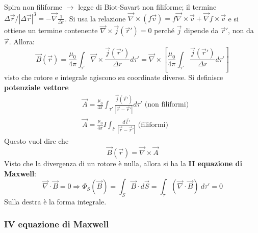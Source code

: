 \documentclass[a4paper]{scrartcl}
\numberwithin{equation}{subsection}
\theoremstyle{style1}
\begin{document}
Spira non filiforme $\to$ legge di Biot-Savart non filiforme; il termine $\Delta \vec{r} / \left\lvert \Delta \vec{r} \right\rvert ^3 = -\vec{\nabla } \frac{1}{\Delta r}$. Si usa la relazione $\vec{\nabla }\times (f \vec{v}) = f\vec{\nabla }\times \vec{v} + \vec{\nabla }f \times \vec{v}$ e si ottiene un termine contenente $\vec{\nabla }\times \vec{j}(\vec{r}') =0$ perch\'e $\vec{j}$ dipende da $\vec{r}' $, non da $\vec{r}$. Allora:
\begin{equation}
	\vec{B}(\vec{r}) = \frac{\mu_0}{4 \pi }\int_{\tau '} \vec{\nabla }\times \frac{\vec{j}(\vec{r}')}{\Delta r}d\tau ' = \vec{\nabla }\times \left[ \frac{\mu_0}{4\pi}\int_{\tau '} \frac{\vec{j}(\vec{r}')}{\Delta r }d\tau ' \right] 
\end{equation}
visto che rotore e integrale agiscono su coordinate diverse. Si definisce \textbf{potenziale vettore} 
\begin{equation}
	\begin{split}
		&\vec{A} = \frac{\mu_0}{4 \pi }\int_{\tau '} \frac{\vec{j}(\vec{r}') }{\left\lvert \vec{r}-\vec{r}' \right\rvert }d\tau ' \text{ (non filiformi}) \\
		&\vec{A} = \frac{\mu_0}{4 \pi }I\int_{l '} \frac{d\vec{l}' }{\left\lvert \vec{r}-\vec{r}' \right\rvert }  \text{ (filiformi}) 
	\end{split}
\end{equation}
Questo vuol dire che
\begin{equation}
	\vec{B}(\vec{r}) = \vec{\nabla }\times \vec{A}
\end{equation}
Visto che la divergenza di un rotore \`e nulla, allora si ha la \textbf{II equazione di Maxwell}:
\begin{equation}
	\vec{\nabla }\cdot \vec{B} = 0 \Rightarrow \Phi_S (\vec{B}) = \int_{S} \vec{B}\cdot d\vec{S} = \int_{\tau } (\vec{\nabla }\cdot \vec{B}) \ d\tau ' = 0
\end{equation}
Sulla destra \`e la forma integrale.
\subsubsection{IV equazione di Maxwell}
\end{document}
